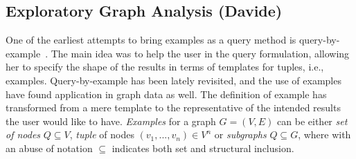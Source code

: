 \subsection{Exploratory Graph Analysis (Davide)} 

One of the earliest attempts to bring examples as a query method is query-by-example~\citep{zloof1975query}.
The main idea was to help the user in the query formulation, allowing her to specify the shape of the results in terms of templates for tuples, i.e., examples.
Query-by-example has been lately revisited, and the use of examples have found application in graph data as well. 
The definition of example has transformed from a mere template to the representative of the intended results the user would like to have.
\emph{Examples} for a graph $G = (V,E)$ can be either \emph{set of nodes} $Q \subseteq V$, \emph{tuple} of nodes $(v_1, ..., v_n) \in V^n$ or \emph{subgraphs} $Q \subseteq G$, where with an abuse of notation $\subseteq$ indicates both set and structural inclusion. 








